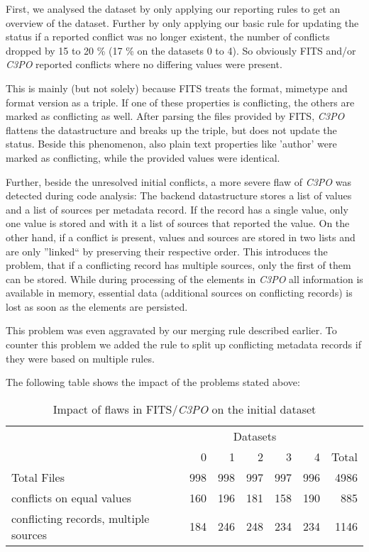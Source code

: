 \documentclass[a4paper,12pt]{article}
\begin{document}
First, we analysed the dataset by only applying our reporting rules to get an overview of the dataset. Further by only applying our basic rule for updating the status if a reported conflict was no longer existent, the number of conflicts dropped by 15 to 20 \% (17 \% on the datasets 0 to 4). So obviously FITS and/or \emph{C3PO} reported conflicts where no differing values were present. 

This is mainly (but not solely) because FITS treats the format, mimetype and format version as a triple. If one of these properties is conflicting, the others are marked as conflicting as well. After parsing the files provided by FITS, \emph{C3PO} flattens the datastructure and breaks up the triple, but does not update the status. Beside this phenomenon, also plain text properties like 'author' were marked as conflicting, while the provided values were identical.

Further, beside the unresolved initial conflicts, a more severe flaw of \emph{C3PO} was detected during code analysis: The backend datastructure stores a list of values and a list of sources per metadata record. If the record has a single value, only one value is stored and with it a list of sources that reported the value. On the other hand, if a conflict is present, values and sources are stored in two lists and are only ''linked`` by preserving their respective order. This introduces the problem, that if a conflicting record has multiple sources, only the first of them can be stored. While during processing of the elements in \emph{C3PO} all information is available in memory, essential data (additional sources on conflicting records) is lost as soon as the elements are persisted.

This problem was even aggravated by our merging rule described earlier. To counter this problem we added the rule to split up conflicting metadata records if they were based on multiple rules.

The following table shows the impact of the problems stated above:

\begin{table}[ht]
\begin{center}

\begin{tabular}[h]{l||r|r|r|r|r||r}
 &  \multicolumn{5}{c}{Datasets} \\
        & 0 & 1 & 2 & 3 & 4 & Total \\
\hline
Total Files & 998 & 998 & 997 & 997 & 996 & 4986\\ 
\hline
conflicts on equal values & 160 & 196 & 181 & 158 & 190 & 885 \\
conflicting records, multiple sources & 184 & 246 & 248 & 234 & 234 & 1146\\

\end{tabular}
\end{center}
\caption{Impact of flaws in FITS/\emph{C3PO} on the initial dataset }
\label{tab:files}
\end{table}
\end{document}
